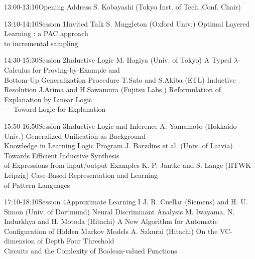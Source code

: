 
\begin{session}{13:00-13:10}{Opening Address}{}
\talk
{S. Kobayashi (Tokyo Inst. of Tech.,Conf. Chair)}{}
\end{session}

\begin{session}{13:10-14:10}{Session 1}{Invited Talk}
\talk
{S. Muggleton (Oxford Univ.)}
{Optimal Layered Learning : a PAC approach \\ to incremental sampling}
\end{session}


\begin{session}{14:30-15:30}{Session 2}{Inductive Logic}
\talk
{M. Hagiya (Univ. of Tokyo)}
{A Typed $\lambda$-Calculus for Proving-by-Example and \\ Bottom-Up Generalization Procedure}
\talk
{T.Sato and S.Akiba (ETL)}
{Inductive Resolution}
\talk
{J.Arima and H.Sawamura (Fujitsu Labs.)}
{Reformulation of Explanation by Linear Logic \\ --- Toward Logic for Explanation}
\end{session}


\begin{session}{15:50-16:50}{Session 3}{Inductive Logic and Inference}
\talk
{A. Yamamoto (Hokkaido Univ.)}
{Generalized Unification as Background \\ Knowledge in Learning Logic Program}
\talk
{J. Barzdins et al. (Univ. of Latvia)}
{Towards Efficient Inductive Synthesis \\ of Expressions from input/output Examples}
\talk
{K. P. Jantke and S. Lange (HTWK Leipzig)}
{Case-Based Representation and Learning \\ of Pattern Languages}
\end{session}


\begin{session}{17:10-18:10}{Session 4}{Approximate Learning I}
\talk
{J. R. Cuellar (Siemens) and H. U. Simon (Univ. of Dortmund)}
{Neural Discriminant Analysis}
\talk
{M. Iwayama, N. Indurkhya and H. Motoda (Hitachi)}
{A New Algorithm for Automatic \\ Configuration of Hidden Markov Models}
\talk
{A. Sakurai (Hitachi)}
{On the VC-dimension of Depth Four Threshold \\ 
Circuits and the Comlexity of Boolean-valued Functions}
\end{session}

